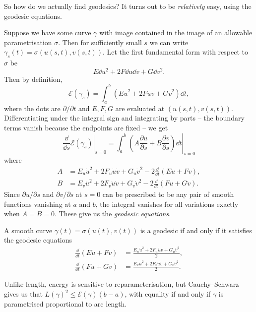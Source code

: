 \documentclass[a4paper]{scrartcl}
\begin{document}
So how do we actually find geodesics? It turns out to be \emph{relatively} easy, using the geodesic equations.

Suppose we have some curve $\gamma$ with image contained in the image of an allowable parametrisation $\sigma$. Then for sufficiently small $s$ we can write $\gamma_s(t) = \sigma(u(s, t), v(s, t))$. Let the first fundamental form with respect to $\sigma$ be
$$
E \dd u ^2 + 2F \dd u \dd v + G \dd v^2.
$$
Then by definition,
$$
\mathcal{E}(\gamma_s) = \int_a^b \left(E \dot{u}^2 + 2F \dot{u} \dot{v} + G \dot{v}^2\right) \dd t,
$$
where the dots are $\partial/\partial t$ and $E, F, G$ are evaluated at $(u(s,t), v(s,t))$. Differentiating under the integral sign and integrating by parts -- the boundary terms vanish because the endpoints are fixed -- we get
$$
\left.\frac{\dd}{\dd s} \mathcal{E}(\gamma_s) \right|_{s = 0} = \left.\int_a^b \left(A \frac{\partial u}{\partial s} + B \frac{\partial v}{\partial s}\right) \dd t \right|_{s = 0}
$$
where
\begin{align*}
    A &= E_u \dot{u}^2 + 2F_u \dot{u} \dot{v} + G_u \dot{v}^2 - 2 \frac{\dd}{\dd t} (E \dot{u} + F \dot{v}), \\
    B &= E_v \dot{u}^2 + 2F_v \dot{u} \dot{v} + G_v \dot{v}^2 - 2 \frac{\dd}{\dd t}(F \dot{u} + G\dot{v}).
\end{align*}
Since $\partial u/\partial s$ and $\partial v/\partial s$ at $s = 0$ can be prescribed to be any pair of smooth functions vanishing at $a$ and $b$, the integral vanishes for all variations exactly when $A = B = 0$. These give us the \emph{geodesic equations}.

\begin{theorem}
    A smooth curve $\gamma(t) = \sigma(u(t), v(t))$ is a geodesic if and only if it satisfies the geodesic equations
    \begin{align*}
        \frac{\dd}{\dd t} (E \dot{u} + F \dot{v}) &= \frac{
        E_u \dot{u}^2 + 2F_u \dot{u} \dot{v} + G_u \dot{v}^2}{2}, \\
        \frac{\dd}{\dd t}(F \dot{u} + G\dot{v})  &= \frac{E_v \dot{u}^2 + 2F_v \dot{u} \dot{v} + G_v \dot{v}^2}{2}.
    \end{align*}
\end{theorem}

Unlike length, energy is sensitive to reparameterisation, but Cauchy--Schwarz gives us that $L(\gamma)^2 \leq \mathcal{E}(\gamma) (b - a)$, with equality if and only if $\gamma$ is parametrised proportional to arc length.
\end{document}
